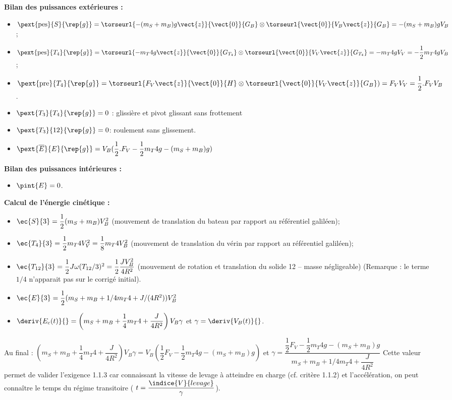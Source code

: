 \begin{corrige}
\textbf{Bilan des puissances extérieures :}
\begin{itemize}
\item $\pext{\text{pes}}{S}{\rep{g}}=\torseurl{-(m_S+m_B )g\vect{z}}{\vect{0}}{G_B} \otimes \torseurl{\vect{0}}{V_B \vect{z}}{G_B} = -(m_S+m_B )gV_B$;
\item $\pext{\text{pes}}{T_4}{\rep{g}}=\torseurl{-m_T4 g\vect{z}}{\vect{0}}{G_{T_4}} \otimes \torseurl{\vect{0}}{V_V \vect{z}}{G_{T_4}}=-m_T4 gV_V=-\dfrac{1}{2} m_T4 gV_B$;
\item $\pext{\text{pre}}{T_4}{\rep{g}}=\torseurl{F_V \vect{z}}{\vect{0}}{H} \otimes \torseurl{\vect{0}}{V_V \vect{z}}{G_B})=F_V V_V=\dfrac{1}{2}.F_V V_B$.
\item $\pext{T_3}{T_4}{\rep{g}}=0$ : glissière et pivot glissant sans frottement
\item $\pext{T_3}{12}{\rep{g}}=0 $: roulement sans glissement.
\item $\pext{\overline{E}}{E}{\rep{g}}=V_B (\dfrac{1}{2}.F_V-\dfrac{1}{2} m_T4 g-(m_S+m_B )g)$
\end{itemize}

\textbf{Bilan des puissances intérieures :}
\begin{itemize}
\item $\pint{E}=0$.
\end{itemize}

\textbf{Calcul de l’énergie cinétique :}
\begin{itemize}
\item $\ec{S}{3}=\dfrac{1}{2} (m_S+m_B ) V_B^2$ (mouvement de translation du bateau par rapport au référentiel galiléen);
\item $\ec{T_4}{3}=\dfrac{1}{2} m_T4 V_V^2=\dfrac{1}{8} m_T4 V_B^2$ (mouvement de translation du vérin par rapport au référentiel galiléen);
\item $\ec{T_{12}}{3}=\dfrac{1}{2} J\omega(T_{12}/3)^2=\dfrac{1}{2}  \dfrac{JV_B^2}{4R^2}$ (mouvement de rotation et translation du solide 12 -- masse négligeable) (Remarque : le terme $1/4$ n’apparait pas sur le corrigé initial).
\item $\ec{E}{3}=\dfrac{1}{2} (m_S+m_B+1/4 m_T4+J/(4R^2 )) V_B^2$
\item $\deriv{E_c(t)}{}=\left(m_S+m_B+\dfrac{1}{4}m_T4+\dfrac{J}{4R^2 }\right) V_B \gamma$ et $\gamma=\deriv{V_B(t)}{}$.
\end{itemize}

Au final :
$\left(m_S+m_B+\dfrac{1}{4} m_T4+\dfrac{J}{4R^2 }\right) V_B \gamma=V_B \left(\dfrac{1}{2}F_V-\dfrac{1}{2} m_T4 g-(m_S+m_B )g\right)$
et 
$\gamma =\dfrac{\dfrac{1}{2} F_V-\dfrac{1}{2} m_T4 g-(m_S+m_B )g}{m_S+m_B+1/4 m_T4+\dfrac{J}{4R^2}}$
Cette valeur permet de valider l’exigence 1.1.3 car connaissant la vitesse de levage à atteindre en charge (cf. critère 1.1.2) et l'accélération, on peut connaître le temps du régime transitoire ( $t=\dfrac{\indice{V}{levage}}{\gamma}$).
\end{corrige}
\else
\fi
\fi
\fi %

